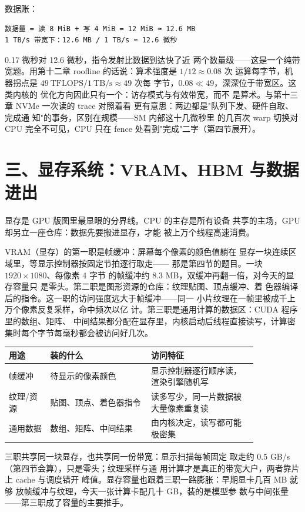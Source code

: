 数据账：

\begin{lstlisting}
数据量 = 读 8 MiB + 写 4 MiB = 12 MiB ≈ 12.6 MB
1 TB/s 带宽下：12.6 MB / 1 TB/s ≈ 12.6 微秒
\end{lstlisting}

0.17 微秒对 12.6 微秒，指令发射比数据到达快了近
两个数量级——这是一个纯带宽题。用第十二章
roofline 的话说：算术强度是 $1/12\approx0.08$ 次
运算每字节，机器拐点是
$49\ \text{TFLOPS}/1\ \text{TB/s}\approx49$ 次每
字节，$0.08\ll49$，深深位于带宽区。这类内核的
优化方向因此只有一个：访存模式与有效带宽，而不
是算术。与第十三章 NVMe 一次读的 trace 对照着看
更有意思：两边都是"队列下发、硬件自取、完成通
知"的事务，区别在规模——SM 内部这十几微秒里
的几百次 warp 切换对 CPU 完全不可见，CPU 只在
fence 处看到"完成"二字（第四节展开）。

\section{三、显存系统：VRAM、HBM 与数据进出}

显存是 GPU 版图里最显眼的分界线。CPU 的主存是所有设备
共享的主场，GPU 却另立一座仓库：数据先要搬进显存，才能
被上万个线程高速消费。

VRAM（显存）的第一职是帧缓冲：屏幕每个像素的颜色值躺在
显存一块连续区域里，等显示控制器按固定节拍逐行取走——
那是第四节的题目。一块 $1920\times1080$、每像素 4 字节
的帧缓冲约 8.3 MB，双缓冲再翻一倍，对今天的显存容量只
是零头。第二职是图形资源的仓库：纹理贴图、顶点缓冲、着
色器编译后的指令。这一职的访问强度远大于帧缓冲——同一
小片纹理在一帧里被成千上万个像素反复采样，命中频次以亿
计。第三职是通用计算的数据区：CUDA 程序里的数组、矩阵、
中间结果都分配在显存里，内核启动后线程直接读写，计算密
集时每个字节每毫秒都会被访问好几次。

\begin{longtable}{L{0.14\linewidth}L{0.34\linewidth}L{0.36\linewidth}}
\toprule
用途 & 装的什么 & 访问特征 \\
\midrule
帧缓冲 & 待显示的像素颜色 & 显示控制器逐行顺序读，渲染引擎随机写 \\
纹理/资源 & 贴图、顶点、着色器指令 & 读多写少，同一片数据被大量像素重复读 \\
通用数据 & 数组、矩阵、中间结果 & 由内核决定，读写都可能极密集 \\
\bottomrule
\end{longtable}

三职共享同一块显存，也共享同一份带宽：显示扫描每帧固定
取走约 0.5 GB/s（第四节会算），只是零头；纹理采样与通
用计算才是真正的带宽大户，两者靠片上 cache 与调度错开
峰值。显存容量也跟着三职一路膨胀：早期显卡几百 MB 就够
放帧缓冲与纹理，今天一张计算卡配几十 GB，装的是模型参
数与中间张量——第三职成了容量的主要推手。

